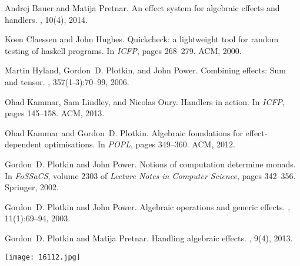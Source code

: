 \documentclass[a4paper,UKenglish]{dagrep}
\begin{document}
% 
% 

\begin{thebibliography}{1}

Andrej Bauer and Matija Pretnar.
\newblock An effect system for algebraic effects and handlers.
, 10(4), 2014.

Koen Claessen and John Hughes.
\newblock Quickcheck: a lightweight tool for random testing of haskell
  programs.
\newblock In {\em {ICFP}}, pages 268--279. {ACM}, 2000.

Martin Hyland, Gordon~D. Plotkin, and John Power.
\newblock Combining effects: Sum and tensor.
, 357(1-3):70--99, 2006.

Ohad Kammar, Sam Lindley, and Nicolas Oury.
\newblock Handlers in action.
\newblock In {\em {ICFP}}, pages 145--158. {ACM}, 2013.

Ohad Kammar and Gordon~D. Plotkin.
\newblock Algebraic foundations for effect-dependent optimisations.
\newblock In {\em {POPL}}, pages 349--360. {ACM}, 2012.

Gordon~D. Plotkin and John Power.
\newblock Notions of computation determine monads.
\newblock In {\em FoSSaCS}, volume 2303 of {\em Lecture Notes in Computer
  Science}, pages 342--356. Springer, 2002.

Gordon~D. Plotkin and John Power.
\newblock Algebraic operations and generic effects.
, 11(1):69--94, 2003.

Gordon~D. Plotkin and Matija Pretnar.
\newblock Handling algebraic effects.
, 9(4), 2013.

\end{thebibliography}


\vfill

\begin{center}
\texttt{[image: 16112.jpg]}
\end{center}
\end{document}
